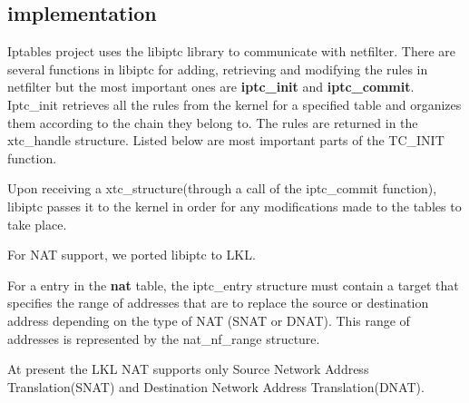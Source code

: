 {{\subsection{\project implementation}
\label{sub-sec:nat-lklnet}
Iptables project uses the libiptc library to communicate with netfilter. There are several functions in libiptc for adding, retrieving and modifying the rules in netfilter but the most important ones are \textbf{iptc_init} and \textbf{iptc_commit}. 
Iptc_init retrieves all the rules from the kernel for a specified table and organizes them according to the chain they belong to. The rules are returned in the xtc_handle structure. Listed below are most important parts of the TC_INIT function.

\lstset{language=C, caption=TC_INIT}


Upon receiving a xtc_structure(through a call of the iptc_commit function), libiptc passes it to the kernel in order for any modifications made to the tables to take place.

For NAT support, we ported libiptc to LKL.

For a entry in the \textbf{nat} table, the iptc_entry structure must contain a target that specifies the range of addresses that are to replace the source or destination address depending on the type of NAT (SNAT or DNAT). This range of addresses is represented by the nat_nf_range structure.

\lstset{language=C, caption=struct nat_nf_range}


At present the LKL NAT supports only  Source Network Address Translation(SNAT) and  Destination Network Address Translation(DNAT).

}}
